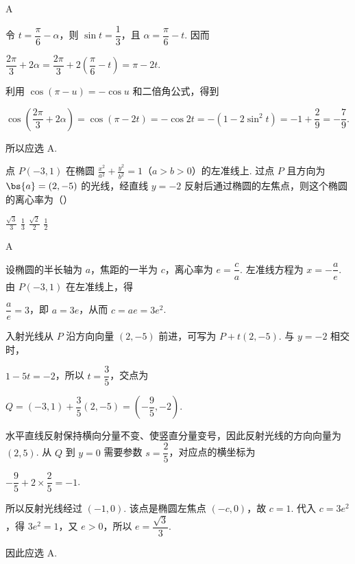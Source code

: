 \begin{answer}
A
\end{answer}

\begin{solution}
令 \(t=\dfrac{\pi}{6}-\alpha\)，则 \(\sin t=\dfrac13\)，且 \(\alpha=\dfrac{\pi}{6}-t\). 因而

\(\dfrac{2\pi}{3}+2\alpha=\dfrac{2\pi}{3}+2\left(\dfrac{\pi}{6}-t\right)=\pi-2t\).

利用 \(\cos(\pi-u)=-\cos u\) 和二倍角公式，得到

\(\cos\left(\dfrac{2\pi}{3}+2\alpha\right)=\cos(\pi-2t)=-\cos2t=-\left(1-2\sin^2t\right)=-1+\dfrac{2}{9}=-\dfrac79\).

所以应选 A.
\end{solution}

\begin{problem}
点 \(P(-3,1)\) 在椭圆 \(\frac{x^2}{a^2} + \frac{y^2}{b^2} = 1\)（\(a > b > 0\)）的左准线上. 过点 \(P\) 且方向为 \(\bs{a} = (2,-5)\) 的光线，经直线 \(y = -2\) 反射后通过椭圆的左焦点，则这个椭圆的离心率为（\quad）

\choices
    {\(\frac{\sqrt{3}}{3}\)}
    {\(\frac{1}{3}\)}
    {\(\frac{\sqrt{2}}{2}\)}
    {\(\frac{1}{2}\)}
\end{problem}

\begin{answer}
A
\end{answer}

\begin{solution}
设椭圆的半长轴为 \(a\)，焦距的一半为 \(c\)，离心率为 \(e=\dfrac ca\). 左准线方程为 \(x=-\dfrac{a}{e}\). 由 \(P(-3,1)\) 在左准线上，得

\(\dfrac{a}{e}=3\)，即 \(a=3e\)，从而 \(c=ae=3e^2\).

入射光线从 \(P\) 沿方向向量 \((2,-5)\) 前进，可写为 \(P+t(2,-5)\). 与 \(y=-2\) 相交时，

\(1-5t=-2\)，所以 \(t=\dfrac35\)，交点为

\(Q=(-3,1)+\dfrac35(2,-5)=\left(-\dfrac95,-2\right)\).

水平直线反射保持横向分量不变、使竖直分量变号，因此反射光线的方向向量为 \((2,5)\). 从 \(Q\) 到 \(y=0\) 需要参数 \(s=\dfrac25\)，对应点的横坐标为

\(-\dfrac95+2\times\dfrac25=-1\).

所以反射光线经过 \((-1,0)\). 该点是椭圆左焦点 \((-c,0)\)，故 \(c=1\). 代入 \(c=3e^2\)，得 \(3e^2=1\)，又 \(e>0\)，所以 \(e=\dfrac{\sqrt{3}}{3}\).

因此应选 A.
\end{solution}

